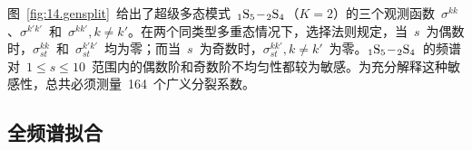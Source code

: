 图~\ref{fig:14.gensplit}~给出了超级多态模式~${}_1{\rm S}_5\!-\!{}_2{\rm S}_4$（$K=2$）的三个观测函数~$\sigma^{kk}$、$\sigma^{k'k'}$~和~$\sigma^{kk'},k\not=k'$。在两个同类型多重态情况下，选择法则规定，当~$s$~为偶数时，$\sigma_{st}^{kk}$~和~$\sigma_{st}^{k'k'}$~均为零；而当~$s$~为奇数时，$\sigma_{st}^{kk'}\!,k\not=k'$~为零。${}_1{\rm S}_5\!-\!{}_2{\rm S}_4$~的频谱对~$1\leq s\leq 10$~范围内的偶数阶和奇数阶不均匀性都较为敏感。为充分解释这种敏感性，总共必须测量~164~个广义分裂系数。
%
%

\subsection{全频谱拟合}
%
%

